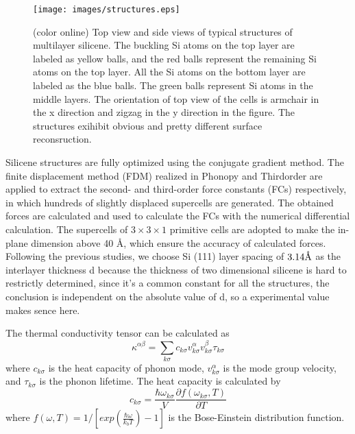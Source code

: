 \documentclass[aps,prb,twocolumn,showpacs,amsmath,amssymb]{revtex4-1}
\newcommand{\angstrom}{\mbox{\normalfont\AA}}
\begin{document}
\begin{figure}[b]
  \texttt{[image: images/structures.eps]}
  \caption{\label{fig:structures}  (color online)  Top view and side views of typical structures of multilayer silicene. The buckling Si atoms on the top layer are labeled as yellow balls, and the red balls represent the remaining Si atoms on the top layer. All the Si atoms on the bottom layer are labeled as the blue balls. The green balls represent Si atoms in the middle layers. The orientation of top view of the cells is armchair in the x direction and zigzag in the y direction in the figure. The structures exihibit obvious and pretty different surface reconsruction.}
\end{figure}

Silicene structures are fully optimized using the conjugate gradient method.  The finite displacement method (FDM) realized in Phonopy\cite{Togo2008} and Thirdorder \cite{Li2014} are applied to extract the second- and third-order force constants (FCs) respectively,  in which hundreds of  slightly displaced supercells are generated. The obtained forces are calculated and used to calculate the FCs with the numerical differential calculation. The supercells of $3 \times 3 \times 1$ primitive cells are adopted to make the in-plane dimension above 40 \angstrom, which ensure the accuracy of calculated forces. Following the previous studies\cite{Pei2013,Fu2014}, we choose Si (111) layer spacing of $3.14 \angstrom$ as the interlayer thickness d because the thickness of two dimensional silicene is hard to restrictly determined, since it's a common constant for all the structures, the conclusion is independent on the absolute value of d, so a experimental value makes sence here.

The thermal conductivity tensor can be calculated as
\begin{equation}
  \kappa^{\alpha\beta} = \sum_{k \sigma}{c_{k \sigma}v^{\alpha}_{k \sigma}v^{\beta}_{k \sigma}\tau_{k \sigma}} \label{eq:kappasum}
\end{equation}
where $c_{k \sigma}$ is the heat capacity of phonon mode,  $v_{k \sigma}^{\alpha}$ is the mode group velocity, and $\tau_{k \sigma}$ is the phonon lifetime. The heat capacity is calculated by
\begin{equation}
  c_{k \sigma}=\frac{\hbar \omega_{k \sigma} }{V} \frac{\partial f(\omega_{k \sigma},T)}{\partial T} \label{eq:cv}
\end{equation}
where $ f(\omega,T)=1/[exp(\frac{\hbar \omega}{k_b T})-1]$ is the Bose-Einstein distribution function.
\end{document}
